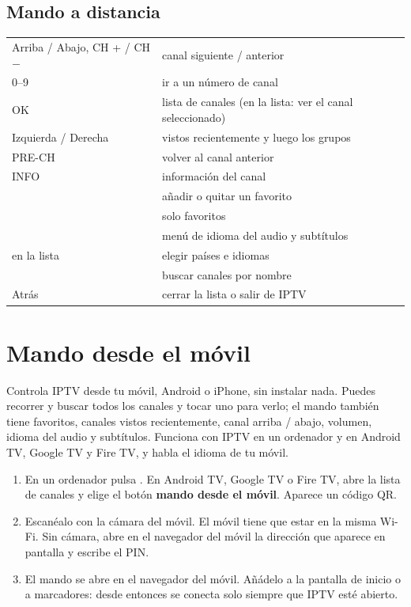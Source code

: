 \subsection{Mando a distancia}
\begin{xltabular}{\linewidth}{@{}KX@{}}
Arriba / Abajo, CH + / CH $-$ & canal siguiente / anterior \\
0--9 & ir a un número de canal \\
OK & lista de canales (en la lista: ver el canal seleccionado) \\
Izquierda / Derecha & vistos recientemente y luego los grupos \\
PRE-CH & volver al canal anterior \\
INFO & información del canal \\
 & añadir o quitar un favorito \\
 & solo favoritos \\
 & menú de idioma del audio y subtítulos \\
 en la lista & elegir países e idiomas \\
 & buscar canales por nombre \\
Atrás & cerrar la lista o salir de IPTV \\
\bottomrule
\end{xltabular}


\section{Mando desde el móvil}
\label{sec:remote}

Controla IPTV desde tu móvil, Android o iPhone, sin instalar nada. Puedes
recorrer y buscar todos los canales y tocar uno para verlo; el mando también
tiene favoritos, canales vistos recientemente, canal arriba / abajo, volumen,
idioma del audio y subtítulos. Funciona con IPTV en un ordenador y en Android
TV, Google TV y Fire TV, y habla el idioma de tu móvil.

\begin{enumerate}
  \item En un ordenador pulsa . En Android TV, Google TV o Fire TV,
        abre la lista de canales y elige el botón \textbf{mando desde el
        móvil}. Aparece un código QR.
  \item Escanéalo con la cámara del móvil. El móvil tiene que estar en la
        misma Wi-Fi. Sin cámara, abre en el navegador del móvil la dirección
        que aparece en pantalla y escribe el PIN.
  \item El mando se abre en el navegador del móvil. Añádelo a la pantalla de
        inicio o a marcadores: desde entonces se conecta solo siempre que
        IPTV esté abierto.
\end{enumerate}

